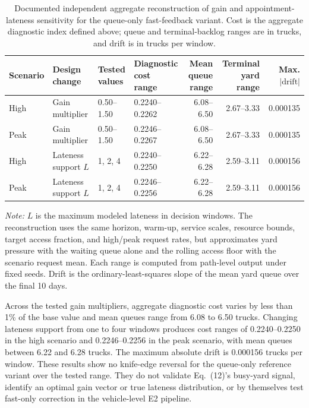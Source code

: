 \documentclass[preprint,12pt,authoryear,a4paper]{elsarticle}
\begin{document}
\begin{table}[htbp]
\centering
\caption{Documented independent aggregate reconstruction of gain and appointment-lateness sensitivity for the queue-only fast-feedback variant. Cost is the aggregate diagnostic index defined above; queue and terminal-backlog ranges are in trucks, and drift is in trucks per window.}
\label{tab:fast-feedback-robustness}
\scriptsize
\setlength{\tabcolsep}{2pt}
\begin{tabular*}{\textwidth}{@{\extracolsep{\fill}}llllrrr@{}}
\toprule
Scenario & \makecell[l]{Design\\change} & \makecell[l]{Tested\\values} & \makecell[r]{Diagnostic cost\\range} & \makecell[r]{Mean queue\\range} & \makecell[r]{Terminal yard\\range} & \makecell[r]{Max.\\$|\mathrm{drift}|$} \\
\midrule
High & Gain multiplier & 0.50--1.50 & 0.2240--0.2262 & 6.08--6.50 & 2.67--3.33 & 0.000135 \\
Peak & Gain multiplier & 0.50--1.50 & 0.2246--0.2267 & 6.08--6.50 & 2.67--3.33 & 0.000135 \\
High & Lateness support \(L\) & 1, 2, 4 & 0.2240--0.2250 & 6.22--6.28 & 2.59--3.11 & 0.000156 \\
Peak & Lateness support \(L\) & 1, 2, 4 & 0.2246--0.2256 & 6.22--6.28 & 2.59--3.11 & 0.000156 \\
\bottomrule
\end{tabular*}
\begin{minipage}{\textwidth}
\footnotesize\raggedright
\textit{Note:} \(L\) is the maximum modeled lateness in decision windows. The reconstruction uses the same horizon, warm-up, service scales, resource bounds, target access fraction, and high/peak request rates, but approximates yard pressure with the waiting queue alone and the rolling access floor with the scenario request mean. Each range is computed from path-level output under fixed seeds. Drift is the ordinary-least-squares slope of the mean yard queue over the final 10 days.
\end{minipage}
\end{table}

Across the tested gain multipliers, aggregate diagnostic cost varies by less than 1\% of the base value and mean queues range from 6.08 to 6.50 trucks. Changing lateness support from one to four windows produces cost ranges of 0.2240--0.2250 in the high scenario and 0.2246--0.2256 in the peak scenario, with mean queues between 6.22 and 6.28 trucks. The maximum absolute drift is 0.000156 trucks per window. These results show no knife-edge reversal for the queue-only reference variant over the tested range. They do not validate Eq.~(12)'s busy-yard signal, identify an optimal gain vector or true lateness distribution, or by themselves test fast-only correction in the vehicle-level E2 pipeline.
\end{document}
